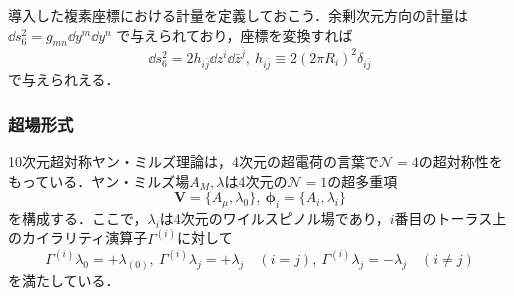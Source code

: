 \documentclass[a4paper,uplatex,dvipdfmx]{jsarticle}
\theoremstyle{definition}
\begin{document}
導入した複素座標における計量を定義しておこう．余剰次元方向の計量は
$
   \dd s_{6}^{2}
   =
   g_{mn}\dd y^{m}\dd y^{n}
$
で与えられており，座標を変換すれば
\begin{equation}
   \dd s_{6}^{2}
   =
   2h_{i\bar{j}}
   \dd z^{i}\dd \bar{z}^{\bar{j}}
   ,\ 
   h_{i\bar{j}}
   \equiv
   2(2\pi R_{i})^2\delta_{i\bar{j}}
   \nonumber
\end{equation}
で与えられえる．


\subsubsection{超場形式}

10次元超対称ヤン・ミルズ理論は，4次元の超電荷の言葉で$\mathcal{N}=4$の超対称性をもっている．ヤン・ミルズ場$A_{M},\lambda$は4次元の$\mathcal{N}=1$の超多重項
\begin{equation}
   \bm{V}
   =
   \{A_{\mu},\lambda_{0}\}
   ,\ 
   \bm{\phi}_{i}
   =
   \{A_{i},\lambda_{i}\}
   \nonumber
\end{equation}
を構成する．ここで，$\lambda_{i}$は4次元のワイルスピノル場であり，$i$番目のトーラス上のカイラリティ演算子$\Gamma^{(i)}$に対して
\begin{equation}
   \Gamma^{(i)}
   \lambda_{0}
   =
   +\lambda_{(0)}
   ,\ 
   \Gamma^{(i)}
   \lambda_{j}
   =
   +\lambda_{j}
   \quad
   (i=j)
   ,\ 
   \Gamma^{(i)}
   \lambda_{j}
   =
   -\lambda_{j}
   \quad
   (i\neq j)
   \nonumber
\end{equation}
を満たしている．
\end{document}
